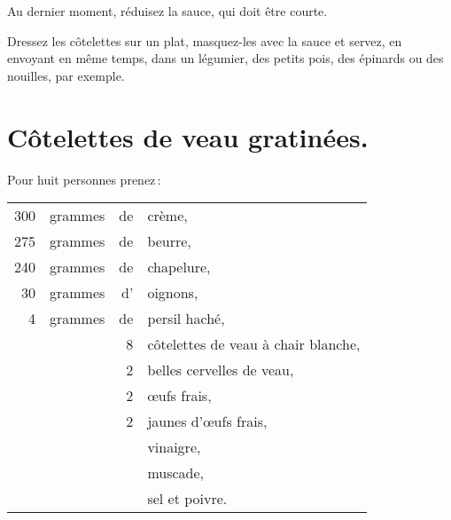 Au dernier moment, réduisez la sauce, qui doit être courte.

Dressez les côtelettes sur un plat, masquez-les avec la sauce et servez, en
envoyant en même temps, dans un légumier, des petits pois, des épinards ou des
nouilles, par exemple.

\section*{\centering Côtelettes de veau gratinées.}
{}

Pour huit personnes prenez :

\medskip

\footnotesize
\begin{longtable}{rrrp{16em}}
    300 & grammes & de & crème,                                                                           \\
    275 & grammes & de & beurre,                                                                          \\
    240 & grammes & de & chapelure,                                                                       \\
     30 & grammes & d' & oignons,                                                                         \\
      4 & grammes & de & persil haché,                                                                    \\
        &         &  8 & côtelettes de veau à chair blanche,                                              \\
        &         &  2 & belles cervelles de veau,                                                        \\
        &         &  2 & œufs frais,                                                                      \\
        &         &  2 & jaunes d'œufs frais,                                                             \\
        &         &    & vinaigre,                                                                        \\
        &         &    & muscade,                                                                         \\
        &         &    & sel et poivre.                                                                   \\
\end{longtable}
\normalsize

